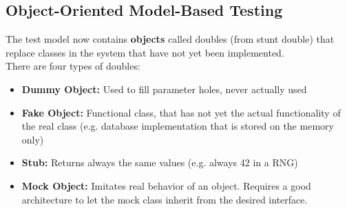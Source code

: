 \subsection{Object-Oriented Model-Based Testing}
The test model now contains \textbf{objects} called doubles (from stunt double) that replace classes in the system that have not yet been implemented.\\
There are four types of doubles:
\vspace{-.5em}
\begin{itemize}
  \item \textbf{Dummy Object:} Used to fill parameter holes, never actually used
  \item \textbf{Fake Object:} Functional class, that has not yet the actual functionality of the real class (e.g. database implementation that is stored on the memory only)
  \item \textbf{Stub:} Returns always the same values (e.g. always 42 in a RNG)
  \item \textbf{Mock Object:} Imitates real behavior of an object. Requires a good architecture to let the mock class inherit from the desired interface.
\end{itemize}
\newpage

